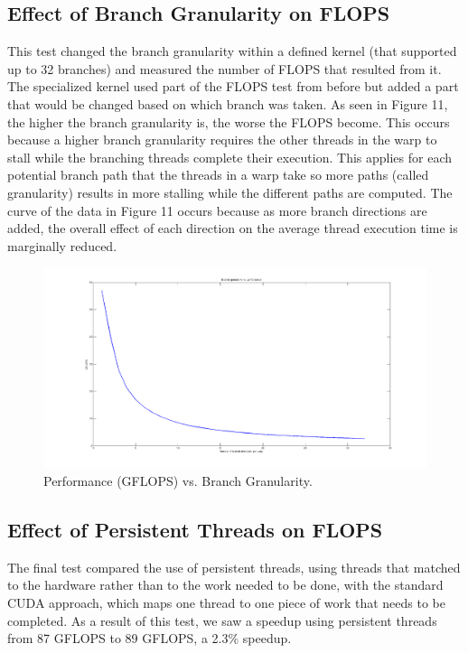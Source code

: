 \documentclass[12pt] {article}
\begin{document}
\subsection{Effect of Branch Granularity on FLOPS}
This test changed the branch granularity within a defined kernel (that supported up to 32 branches) and measured the number of FLOPS that resulted from it. The specialized kernel used part of the FLOPS test from before but added a part that would be changed based on which branch was taken. As seen in Figure 11, the higher the branch granularity is, the worse the FLOPS become. This occurs because a higher branch granularity requires the other threads in the warp to stall while the branching threads complete their execution. This applies for each potential branch path that the threads in a warp take so more paths (called granularity) results in more stalling while the different paths are computed. The curve of the data in Figure 11 occurs because as more branch directions are added, the overall effect of each direction on the average thread execution time is marginally reduced.

\begin{figure}[ht!]
	\centering
	\includegraphics[width=5in]{figures/branch_v_perf.png}
	\caption{Performance (GFLOPS) vs. Branch Granularity.}
\end{figure}
\FloatBarrier

\subsection{Effect of Persistent Threads on FLOPS}
The final test compared the use of persistent threads, using threads that matched to the hardware rather than to the work needed to be done, with the standard CUDA approach, which maps one thread to one piece of work that needs to be completed. As a result of this test, we saw a speedup using persistent threads from 87 GFLOPS to 89 GFLOPS, a 2.3\% speedup.
\end{document}
